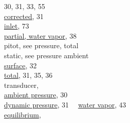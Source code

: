 \documentclass[
  english,
]{book}
\begin{document}
30, 31, 33, 55\\
\hspace*{0.333em}\hspace*{0.333em}\hspace*{0.333em}\hspace*{0.333em}\href{./4-the-state-of-the-atmosphere.html\#qcx}{corrected},
31\\
\hspace*{0.333em}\hspace*{0.333em}\href{./7-aerosol-particle-measurements.html\#pcn}{inlet},
73\\
\hspace*{0.333em}\hspace*{0.333em}\href{./4-the-state-of-the-atmosphere.html\#dewpt-corrected}{partial,
water vapor}, 38\\
\hspace*{0.333em}\hspace*{0.333em}pitot, see pressure, total\\
\hspace*{0.333em}\hspace*{0.333em}static, see pressure ambient\\
\hspace*{0.333em}\hspace*{0.333em}\href{./4-the-state-of-the-atmosphere.html\#p-special}{surface},
32\\
\hspace*{0.333em}\hspace*{0.333em}\href{./4-the-state-of-the-atmosphere.html\#qcx}{total},
31, 35, 36\\
\hspace*{0.333em}\hspace*{0.333em}transducer,\\
\hspace*{0.333em}\hspace*{0.333em}\hspace*{0.333em}\hspace*{0.333em}\href{./4-the-state-of-the-atmosphere.html\#psx}{ambient
pressure}, 30\\
\hspace*{0.333em}\hspace*{0.333em}\hspace*{0.333em}\hspace*{0.333em}\href{./4-the-state-of-the-atmosphere.html\#qcx}{dynamic
pressure}, 31 ~~\href{./4-the-state-of-the-atmosphere.html\#ewx}{water
vapor}, 43\\
\hspace*{0.333em}\hspace*{0.333em}\hspace*{0.333em}\hspace*{0.333em}\href{./4-the-state-of-the-atmosphere.html\#dewpt-corrected}{equilibrium},
\end{document}
